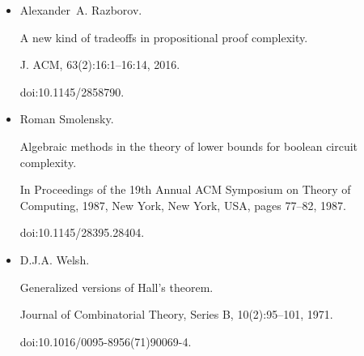 \begin{itemize}
Mat. Zametki, 41:598–607, 1987.





\item 
[22]

Alexander A. Razborov.


A new kind of tradeoffs in propositional proof complexity.


J. ACM, 63(2):16:1–16:14, 2016.


doi:10.1145/2858790.





\item 
[23]

Roman Smolensky.


Algebraic methods in the theory of lower bounds for boolean circuit
complexity.


In Proceedings of the 19th Annual ACM Symposium on Theory of
Computing, 1987, New York, New York, USA, pages 77–82, 1987.


doi:10.1145/28395.28404.





\item 
[24]

D.J.A. Welsh.


Generalized versions of Hall’s theorem.


Journal of Combinatorial Theory, Series B, 10(2):95–101, 1971.


doi:10.1016/0095-8956(71)90069-4.





\end{itemize}

